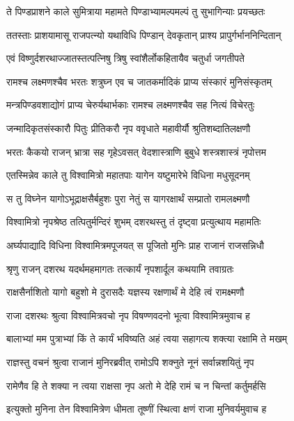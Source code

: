 \twolineshloka
{ते पिण्डप्राशने काले सुमित्राया महामते}
{पिण्डाभ्यामल्पमल्पं तु सुभागिन्याः प्रयच्छतः} %

\twolineshloka
{ततस्ताः प्राशयामासू राजपत्न्यो यथाविधि}
{पिण्डान् देवकृतान् प्राश्य प्रापुर्गर्भाननिन्दितान्} %

\twolineshloka
{एवं विष्णुर्दशरथाज्जातस्तत्पत्निषु त्रिषु}
{स्वांशैर्लोकहितायैव चतुर्धा जगतीपते} %

\twolineshloka
{रामश्च लक्ष्मणश्चैव भरतः शत्रुघ्न एव च}
{जातकर्मादिकं प्राप्य संस्कारं मुनिसंस्कृतम्} %

\twolineshloka
{मन्त्रपिण्डवशाद्योगं प्राप्य चेरुर्यथार्भकाः}
{रामश्च लक्ष्मणश्चैव सह नित्यं विचेरतुः} %

\twolineshloka
{जन्मादिकृतसंस्कारौ पितुः प्रीतिकरौ नृप}
{ववृधाते महावीर्यौ श्रुतिशब्दातिलक्षणौ} %

\twolineshloka
{भरतः कैकयो राजन् भ्रात्रा सह गृहेऽवसत्}
{वेदशास्त्राणि बुबुधे शस्त्रशास्त्रं नृपोत्तम} %

\twolineshloka
{एतस्मिन्नेव काले तु विश्वामित्रो महातपाः}
{यागेन यष्टुमारेभे विधिना मधुसूदनम्} %

\twolineshloka
{स तु विघ्नेन यागोऽभूद्राक्षसैर्बहुशः पुरा}
{नेतुं स यागरक्षार्थं सम्प्रातो रामलक्ष्मणौ} %

\twolineshloka
{विश्वामित्रो नृपश्रेष्ठ तत्पितुर्मन्दिरं शुभम्}
{दशरथस्तु तं दृष्ट्वा प्रत्युत्थाय महामतिः} %

\twolineshloka
{अर्घ्यपाद्यादि विधिना विश्वामित्रमपूजयत्}
{स पूजितो मुनिः प्राह राजानं राजसन्निधौ} %

\twolineshloka
{श्रृणु राजन् दशरथ यदर्थमहमागतः}
{तत्कार्यं नृपशार्दूल कथयामि तवाग्रतः} %

\twolineshloka
{राक्षसैर्नाशितो यागो बहुशो मे दुरासदैः}
{यज्ञस्य रक्षणार्थं मे देहि त्वं रामक्ष्मणौ} %

\twolineshloka
{राजा दशरथः श्रुत्वा विश्वामित्रवचो नृप}
{विषण्णवदनो भूत्वा विश्वामित्रमुवाच ह} %

\twolineshloka
{बालाभ्यां मम पुत्राभ्यां किं ते कार्यं भविष्यति}
{अहं त्वया सहागत्य शक्त्या रक्षामि ते मखम्} %

\twolineshloka
{राज्ञस्तु वचनं श्रुत्वा राजानं मुनिरब्रवीत्}
{रामोऽपि शक्नुते नूनं सर्वान्नशयितुं नृप} %

\twolineshloka
{रामेणैव हि ते शक्या न त्वया राक्षसा नृप}
{अतो मे देहि रामं च न चिन्तां कर्तुमर्हसि} %

\twolineshloka
{इत्युक्तो मुनिना तेन विश्वामित्रेण धीमता}
{तूष्णीं स्थित्वा क्षणं राजा मुनिवर्यमुवाच ह} %

